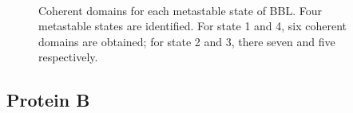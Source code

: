 \documentclass[12pt]{article}
\begin{document}

\begin{figure}[htbp]
  \addtocounter{subfigure}{3}
  \\
  \caption{\label{2WAV}Coherent domains for each metastable state of BBL. Four metastable states are identified. For state 1 and 4, six coherent domains are obtained; for state 2 and 3, there seven and five respectively.}
\end{figure}

\clearpage

\subsection*{Protein B}
\end{document}
